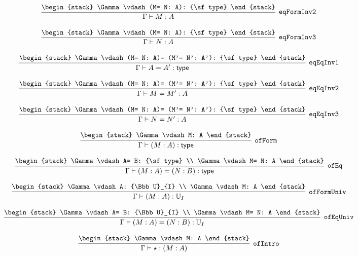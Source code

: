 \[
\infer[{\tt eqFormInv2}]{\Gamma \vdash M: A}{
\begin{stack}
\Gamma \vdash (M= N: A): {\sf type}
\end{stack}}
\]

\[
\infer[{\tt eqFormInv3}]{\Gamma \vdash N: A}{
\begin{stack}
\Gamma \vdash (M= N: A): {\sf type}
\end{stack}}
\]

\[
\infer[{\tt eqEqInv1}]{\Gamma \vdash A= A': {\sf type}}{
\begin{stack}
\Gamma \vdash (M= N: A)= (M'= N': A'): {\sf type}
\end{stack}}
\]

\[
\infer[{\tt eqEqInv2}]{\Gamma \vdash M= M': A}{
\begin{stack}
\Gamma \vdash (M= N: A)= (M'= N': A'): {\sf type}
\end{stack}}
\]

\[
\infer[{\tt eqEqInv3}]{\Gamma \vdash N= N': A}{
\begin{stack}
\Gamma \vdash (M= N: A)= (M'= N': A'): {\sf type}
\end{stack}}
\]

\[
\infer[{\tt ofForm}]{\Gamma \vdash (M: A): {\sf type}}{
\begin{stack}
\Gamma \vdash M: A
\end{stack}}
\]

\[
\infer[{\tt ofEq}]{\Gamma \vdash (M: A)= (N: B): {\sf type}}{
\begin{stack}
\Gamma \vdash A= B: {\sf type}
\\
\Gamma \vdash M= N: A
\end{stack}}
\]

\[
\infer[{\tt ofFormUniv}]{\Gamma \vdash (M: A): {\Bbb U}_{I}}{
\begin{stack}
\Gamma \vdash A: {\Bbb U}_{I}
\\
\Gamma \vdash M: A
\end{stack}}
\]

\[
\infer[{\tt ofEqUniv}]{\Gamma \vdash (M: A)= (N: B): {\Bbb U}_{I}}{
\begin{stack}
\Gamma \vdash A= B: {\Bbb U}_{I}
\\
\Gamma \vdash M= N: A
\end{stack}}
\]

\[
\infer[{\tt ofIntro}]{\Gamma \vdash \star : (M: A)}{
\begin{stack}
\Gamma \vdash M: A
\end{stack}}
\]

